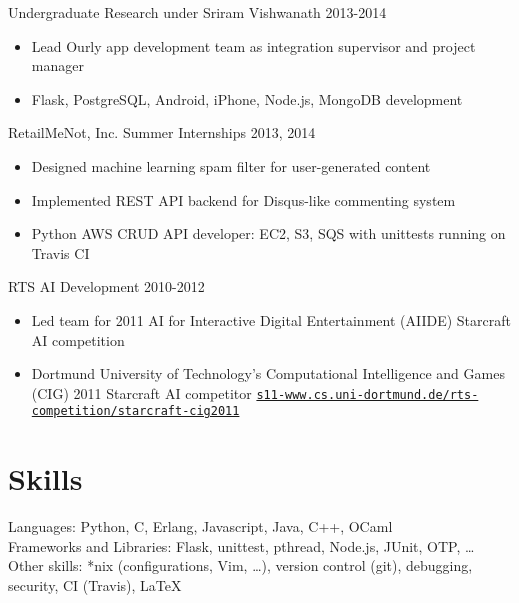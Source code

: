 \documentclass[line,margin]{res}
\begin{document}
\begin{resume}
\vspace{-6pt}
Undergraduate Research under Sriram Vishwanath
\hfill  2013-2014
    \begin{itemize} \itemsep -2pt %
    \item Lead Ourly app development team as integration supervisor and project manager
    \item Flask, PostgreSQL, Android, iPhone, Node.js, MongoDB development
    \end{itemize}

\vspace{-6pt}
RetailMeNot, Inc. Summer Internships
\hfill  2013, 2014
    \begin{itemize} \itemsep -2pt %
    \item Designed machine learning spam filter for user-generated content
    \item Implemented REST API backend for Disqus-like commenting system
    \item Python AWS CRUD API developer: EC2, S3, SQS with unittests running on Travis CI
    \end{itemize}

\vspace{-6pt}
RTS AI Development
\hfill  2010-2012
    \begin{itemize} \itemsep -2pt %
    \item Led team for 2011 AI for Interactive Digital Entertainment (AIIDE) Starcraft AI competition  
    \item Dortmund University of Technology’s Computational Intelligence and Games (CIG) 2011 Starcraft AI
        competitor \href{https://www.s11-www.cs.uni-dortmund.de/rts-competition/starcraft-cig2011}{\texttt{s11-www.cs.uni-dortmund.de/rts-competition/starcraft-cig2011}}
    \end{itemize}


\vspace{-8pt}
\section{Skills}
\vspace{12pt} 
    Languages: Python, C, Erlang, Javascript, Java, C++, OCaml \\ 
    Frameworks and Libraries: Flask, unittest, pthread, Node.js, JUnit, OTP, \ldots \\
    Other skills: *nix (configurations, Vim, \ldots), version control (git), debugging, security, CI (Travis), \LaTeX



\end{resume}
\end{document}

